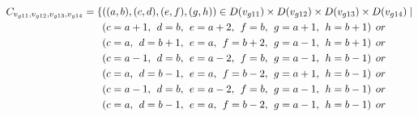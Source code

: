 \begin{align*}
\Const{g11}{g12}{g13}{g14}=\{&((a,b),(c,d),(e,f),(g,h))\in \Domain{g11}\times \Domain{g12}\times\Domain{g13}\times\Domain{g14}\mid\\
&(c = a + 1,\hspace{1ex}d = b,\hspace{1ex}e = a + 2, \hspace{1ex}f = b,\hspace{1ex}g=a+1,\hspace{1ex}h=b+1)\hspace{1ex} or\\
&(c = a,\hspace{1ex}d = b+1,\hspace{1ex}e = a, \hspace{1ex}f = b+2,\hspace{1ex}g=a-1,\hspace{1ex}h=b+1)\hspace{1ex} or\\
&(c = a-1,\hspace{1ex}d = b,\hspace{1ex}e = a-2,\hspace{1ex} f = b,\hspace{1ex}g=a-1,\hspace{1ex}h=b-1)\hspace{1ex} or\\
&(c = a,\hspace{1ex}d = b-1,\hspace{1ex}e = a, \hspace{1ex}f = b-2,\hspace{1ex}g=a+1,\hspace{1ex}h=b-1)\hspace{1ex} or\\
&(c = a-1,\hspace{1ex}d = b,\hspace{1ex}e = a-2, \hspace{1ex}f = b,\hspace{1ex}g=a-1,\hspace{1ex}h=b-1)\hspace{1ex} or\\
&(c = a,\hspace{1ex}d = b-1,\hspace{1ex}e = a, \hspace{1ex}f = b-2,\hspace{1ex}g=a-1,\hspace{1ex}h=b-1)\hspace{1ex} or\\

\end{align*}
